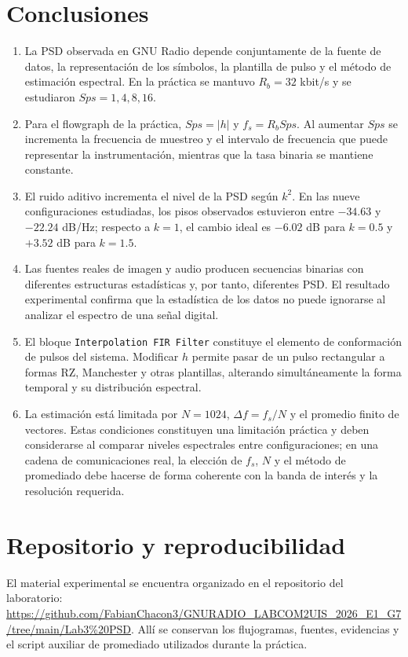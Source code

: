 \documentclass[journal]{IEEEtran}
\newcommand{\Repositorio}{\url{https://github.com/FabianChacon3/GNURADIO_LABCOM2UIS_2026_E1_G7/tree/main/Lab3\%20PSD}}
\begin{document}
\section{Conclusiones}
\begin{enumerate}[leftmargin=*]
\item La PSD observada en GNU Radio depende conjuntamente de la fuente de datos, la representación de los símbolos, la plantilla de pulso y el método de estimación espectral. En la práctica se mantuvo $R_b=32$ kbit/s y se estudiaron $Sps=1,4,8,16$.
\item Para el flowgraph de la práctica, $Sps=|h|$ y $f_s=R_bSps$. Al aumentar $Sps$ se incrementa la frecuencia de muestreo y el intervalo de frecuencia que puede representar la instrumentación, mientras que la tasa binaria se mantiene constante.
\item El ruido aditivo incrementa el nivel de la PSD según $k^2$. En las nueve configuraciones estudiadas, los pisos observados estuvieron entre $-34.63$ y $-22.24$ dB/Hz; respecto a $k=1$, el cambio ideal es $-6.02$ dB para $k=0.5$ y $+3.52$ dB para $k=1.5$.
\item Las fuentes reales de imagen y audio producen secuencias binarias con diferentes estructuras estadísticas y, por tanto, diferentes PSD. El resultado experimental confirma que la estadística de los datos no puede ignorarse al analizar el espectro de una señal digital.
\item El bloque \texttt{Interpolation FIR Filter} constituye el elemento de conformación de pulsos del sistema. Modificar $h$ permite pasar de un pulso rectangular a formas RZ, Manchester y otras plantillas, alterando simultáneamente la forma temporal y su distribución espectral.
\item La estimación está limitada por $N=1024$, $\Delta f=f_s/N$ y el promedio finito de vectores. Estas condiciones constituyen una limitación práctica y deben considerarse al comparar niveles espectrales entre configuraciones; en una cadena de comunicaciones real, la elección de $f_s$, $N$ y el método de promediado debe hacerse de forma coherente con la banda de interés y la resolución requerida.
\end{enumerate}

\section{Repositorio y reproducibilidad}
El material experimental se encuentra organizado en el repositorio del laboratorio: \Repositorio. Allí se conservan los flujogramas, fuentes, evidencias y el script auxiliar de promediado utilizados durante la práctica.
\end{document}
